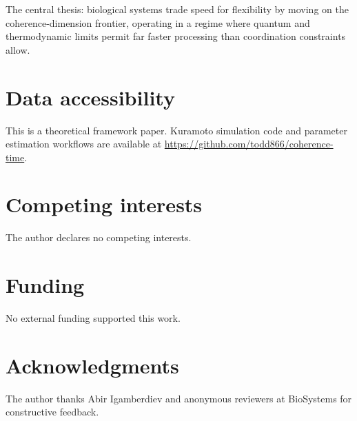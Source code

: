 \documentclass[12pt]{article}
\begin{document}
The central thesis: biological systems trade speed for flexibility by moving on the coherence-dimension frontier, operating in a regime where quantum and thermodynamic limits permit far faster processing than coordination constraints allow.

\section*{Data accessibility}

This is a theoretical framework paper. Kuramoto simulation code and parameter estimation workflows are available at \url{https://github.com/todd866/coherence-time}.

\section*{Competing interests}

The author declares no competing interests.

\section*{Funding}

No external funding supported this work.

\section*{Acknowledgments}

The author thanks Abir Igamberdiev and anonymous reviewers at BioSystems for constructive feedback.
\end{document}
